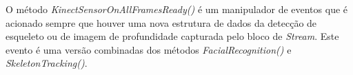 O método \textit{KinectSensorOnAllFramesReady()} é um manipulador de eventos que é acionado sempre que houver uma nova estrutura de dados da detecção de esqueleto ou de imagem de profundidade capturada pelo bloco de \textit{Stream}. Este evento é uma versão combinadas dos métodos \textit{FacialRecognition()} e \textit{SkeletonTracking()}.